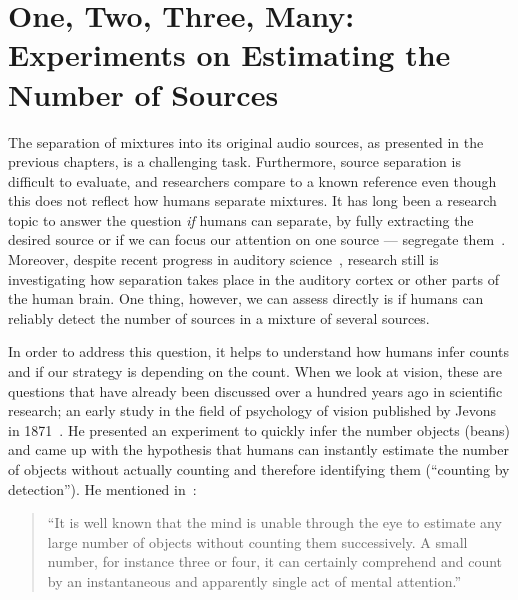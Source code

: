 \chapter[Experiments on Estimating the Number of Sources]{One, Two, Three, Many: Experiments on Estimating the Number of Sources}
\label{cha:countanalysis}
\bigskip
\bigskip
\bigskip
\bigskip
%
The separation of mixtures into its original audio sources, as presented in the previous chapters, is a challenging task.
Furthermore, source separation is difficult to evaluate, and researchers compare to a known reference even though this does not reflect how humans separate mixtures.
It has long been a research topic to answer the question \emph{if} humans can separate, by fully extracting the desired source or if we can focus our attention on one source --- segregate them~\cite{bregman}.
Moreover, despite recent progress in auditory science~\cite{carlyon04, koelsch05, rabinowitz13}, research still is investigating how separation takes place in the auditory cortex or other parts of the human brain.
One thing, however, we can assess directly is if humans can reliably detect the number of sources in a mixture of several sources.
\par
In order to address this question, it helps to understand how humans infer counts and if our strategy is depending on the count.
When we look at vision, these are questions that have already been discussed over a hundred years ago in scientific research; an early study in the field of psychology of vision published by Jevons in 1871~\cite{jevons1871}.
He presented an experiment to quickly infer the number objects (beans) and came up with the hypothesis that humans can instantly estimate the number of objects without actually counting and therefore identifying them (``counting by detection'').
He mentioned in~\cite{jevons1871}:

\begin{quote}
``It is well known that the mind is unable through the eye to estimate any large number of objects without  counting them successively. A small number, for instance three or four, it can certainly comprehend and count by an instantaneous and apparently single act of mental attention.''
\end{quote}

